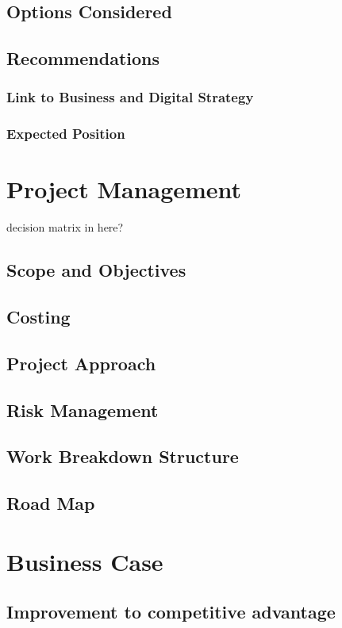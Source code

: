 \documentclass{article}
\begin{document}
\subsection{Options Considered}
\subsection{Recommendations}
\subsubsection{Link to Business and Digital Strategy}
\subsubsection{Expected Position}

\pagebreak{}
\section{Project Management}
decision matrix in here?
\subsection{Scope and Objectives}
\subsection{Costing}
\subsection{Project Approach}
\subsection{Risk Management}
\subsection{Work Breakdown Structure}
\subsection{Road Map}

\pagebreak{}
\section{Business Case}
\subsection{Improvement to competitive advantage}
\end{document}
